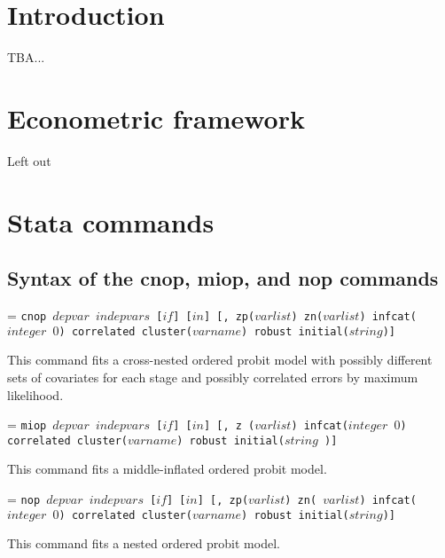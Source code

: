 \documentclass[letterpaper,fleqn,11pt]{article}
\begin{document}
\begin{onehalfspace}%

\section{Introduction}

TBA...

\section{Econometric framework}

Left out

\section{Stata commands}

\subsection*{Syntax of the cnop, miop, and nop commands}


\hangindent=\parindent
\noindent \texttt{cnop $depvar$ $indepvars$ [$if$] [$in$] [, zp($varlist$)
zn($varlist$) infcat($integer$ $0$) correlated cluster($varname$) robust
initial($string$)] }

This command fits a cross-nested ordered probit model with possibly
different sets of covariates for each stage and possibly correlated errors
by maximum likelihood.

\hangindent=\parindent
\noindent \texttt{miop $depvar$ $indepvars$ [$if$] [$in$] [, z ($varlist$)
infcat($integer$ $0$) correlated cluster($varname$) robust initial($string$%
)] }

This command fits a middle-inflated ordered probit model.

\hangindent=\parindent
\noindent \texttt{nop $depvar$ $indepvars$ [$if$] [$in$] [, zp($varlist$) zn(%
$varlist$) infcat($integer$ $0$) correlated cluster($varname$) robust
initial($string$)] }

This command fits a nested ordered probit model.



\end{onehalfspace}
\end{document}
